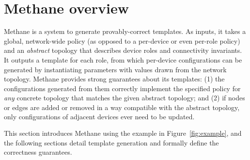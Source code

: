 \documentclass{sig-alternate-10pt}
\newcommand{\sysname}{{\small \sf Methane}\xspace}
\newcommand{\sysnamesec}{{\sf Methane}\xspace}
\begin{document}
%

%
%
%
%

\section{Methane overview}
\label{sec:overview}

\sysname is a system to generate provably-correct templates.  As inputs, it takes a global, network-wide policy (as opposed to a per-device or even per-role policy) and an {\em abstract} topology that describes device roles and
connectivity invariants.  It outputs a template for each role, from which per-device configurations can be generated by instantiating parameters with values drawn from the network topology.
\sysname provides strong guarantees about its templates:
(1) the configurations generated from them correctly implement the specified policy for {\em any} concrete topology that matches the given abstract topology; and (2) if nodes or edges are added or removed in a way compatible
with the abstract topology, only configurations of adjacent devices ever need to be updated.

This section introduces \sysname using the example in Figure~\ref{fig:example}, and the following sections detail template generation and formally define the correctness guarantees.


\end{document}
